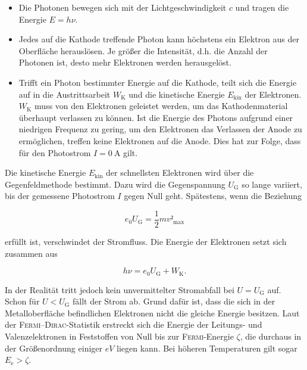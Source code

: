 \begin{itemize}
	\item Die Photonen bewegen sich mit der Lichtgeschwindigkeit $c$ und tragen die Energie  $E=h\nu$.
	\item Jedes auf die Kathode treffende Photon kann höchstens ein Elektron aus der Oberfläche herauslösen. Je größer die Intensität, d.h. die Anzahl der Photonen ist, desto mehr Elektronen werden herausgelöst.
	\item Trifft ein Photon bestimmter Energie auf die Kathode, teilt sich die Energie auf in die Austrittsarbeit $W_\mathup{K}$ und die kinetische Energie $E_\mathup{kin}$ der Elektronen. $W_\mathup{K}$ muss von den Elektronen geleistet werden, um das Kathodenmaterial überhaupt verlassen zu können. Ist die Energie des Photons aufgrund einer niedrigen Frequenz zu gering, um den Elektronen das Verlassen der Anode zu ermöglichen, treffen keine Elektronen auf die Anode. Dies hat zur Folge, dass für den Photostrom $I=\SI{0}{\ampere}$ gilt.
\end{itemize}

Die kinetische Energie $E_\mathup{kin}$ der schnellsten Elektronen wird über die Gegenfeldmethode bestimmt. 
Dazu wird die Gegenspannung $U_\mathup{G}$ so lange variiert, bis der gemessene Photostrom $I$ gegen Null geht. 
Spätestens, wenn die Beziehung

\begin{equation}
	e_0 U_\mathup{G}=\frac{1}{2}mv²_\mathup{max}
\end{equation}

erfüllt ist, verschwindet der Stromfluss.
Die Energie der Elektronen setzt sich zusammen aus

\begin{equation}
	h\nu=e_0 U_\mathup{G}+W_\mathup{K}.
	\label{eq:einstein}
\end{equation}

In der Realität tritt jedoch kein unvermittelter Stromabfall bei $U = U_\mathup{G}$ auf. 
Schon für $U< U_\mathup{G}$ fällt der Strom ab.
Grund dafür ist, dass die sich in der Metalloberfläche befindlichen Elektronen nicht die gleiche Energie besitzen. 
Laut der \textsc{Fermi}--\textsc{Dirac}-Statistik erstreckt sich die Energie der Leitungs- und Valenzelektronen in Feststoffen von Null bis zur \textsc{Fermi}-Energie $\zeta$, die durchaus in der Größenordnung einiger $eV$ liegen kann.
Bei höheren Temperaturen gilt sogar $E_\mathup{e}>\zeta$. 

